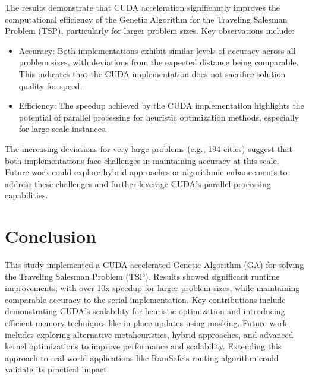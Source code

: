 \documentclass[conference]{IEEEtran}
\begin{document}
The results demonstrate that CUDA acceleration significantly improves the computational efficiency of the Genetic Algorithm for the Traveling Salesman Problem (TSP), particularly for larger problem sizes. Key observations include:
    \begin{itemize}
        \item Accuracy: Both implementations exhibit similar levels of accuracy across all problem sizes, with deviations from the expected distance being comparable. This indicates that the CUDA implementation does not sacrifice solution quality for speed.
        \item   Efficiency: The speedup achieved by the CUDA implementation highlights the potential of parallel processing for heuristic optimization methods, especially for large-scale instances.
    \end{itemize}

The increasing deviations for very large problems (e.g., 194 cities) suggest that both implementations face challenges in maintaining accuracy at this scale. Future work could explore hybrid approaches or algorithmic enhancements to address these challenges and further leverage CUDA’s parallel processing capabilities.

\section{Conclusion}

This study implemented a CUDA-accelerated Genetic Algorithm (GA) for solving the Traveling Salesman Problem (TSP). Results showed significant runtime improvements, with over 10x speedup for larger problem sizes, while maintaining comparable accuracy to the serial implementation. Key contributions include demonstrating CUDA’s scalability for heuristic optimization and introducing efficient memory techniques like in-place updates using masking. Future work includes exploring alternative metaheuristics, hybrid approaches, and advanced kernel optimizations to improve performance and scalability. Extending this approach to real-world applications like RamSafe's routing algorithm could validate its practical impact.



\end{document}
